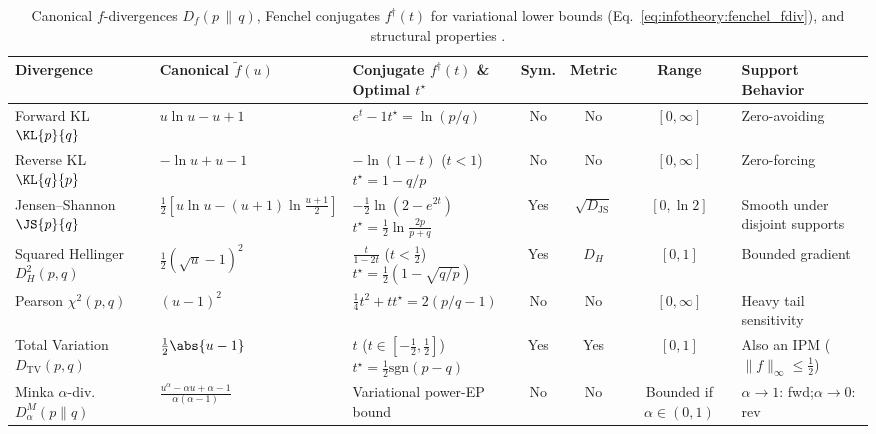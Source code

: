 \documentclass[../../../../master.tex]{subfiles}
\begin{document}
\begin{table}[htbp]
\centering
\footnotesize
\setlength{\tabcolsep}{3.5pt}
\renewcommand{\arraystretch}{1.22}
\caption{Canonical $f$-divergences $D_f(p \,\|\, q)$, Fenchel conjugates $f^\dagger(t)$ for variational lower bounds (Eq.~\eqref{eq:infotheory:fenchel_fdiv}), and structural properties  .}
\label{tab:infotheory:divergences}
\begin{tabularx}{\textwidth}{@{}>{\raggedright\arraybackslash}p{2.65cm}>{\raggedright\arraybackslash\hsize=0.92\hsize}X>{\raggedright\arraybackslash\hsize=1.08\hsize}Xccc>{\raggedright\arraybackslash}p{2.45cm}@{}}
\toprule
\textbf{Divergence} & \textbf{Canonical $\tilde{f}(u)$} & \textbf{Conjugate $f^\dagger(t)$ \& Optimal $t^\star$} & \textbf{Sym.} & \textbf{Metric} & \textbf{Range} & \textbf{Support Behavior} \\
\midrule
Forward KL $\KL{p}{q}$ & $u\ln u - u + 1$ & $e^t - 1$\newline $t^\star = \ln(p/q)$ & No & No & $[0,\infty]$ & Zero-avoiding \\
Reverse KL $\KL{q}{p}$ & $-\ln u + u - 1$ & $-\ln(1-t)$ ($t<1$)\newline $t^\star = 1 - q/p$ & No & No & $[0,\infty]$ & Zero-forcing \\
Jensen--Shannon $\JS{p}{q}$ & $\frac{1}{2}[u\ln u - (u+1)\ln\frac{u+1}{2}]$ & $-\frac{1}{2}\ln(2 - e^{2t})$\newline $t^\star = \frac{1}{2}\ln\frac{2p}{p+q}$ & Yes & $\sqrt{D_{\mathrm{JS}}}$ & $[0,\ln 2]$ & Smooth under disjoint supports \\
Squared Hellinger $D_H^2(p,q)$ & $\frac{1}{2}(\sqrt{u} - 1)^2$ & $\frac{t}{1 - 2t}$ ($t < \frac{1}{2}$)\newline $t^\star = \frac{1}{2}(1 - \sqrt{q/p})$ & Yes & $D_H$ & $[0,1]$ & Bounded gradient \\
Pearson $\chi^2(p,q)$ & $(u - 1)^2$ & $\frac{1}{4}t^2 + t$\newline $t^\star = 2(p/q - 1)$ & No & No & $[0,\infty]$ & Heavy tail sensitivity \\
Total Variation $D_{\mathrm{TV}}(p,q)$ & $\frac{1}{2}\abs{u - 1}$ & $t$ ($t \in [-\frac{1}{2}, \frac{1}{2}]$)\newline $t^\star = \frac{1}{2}\mathrm{sgn}(p-q)$ & Yes & Yes & $[0,1]$ & Also an IPM ($\|f\|_\infty \le \frac{1}{2}$) \\
Minka $\alpha$-div.\ $D_\alpha^M(p\|q)$ & $\frac{u^\alpha - \alpha u + \alpha - 1}{\alpha(\alpha - 1)}$ & Variational power-EP bound & No & No & Bounded if $\alpha\in(0,1)$ & $\alpha\to 1$: fwd;\newline $\alpha\to 0$: rev \\
\bottomrule
\end{tabularx}
\end{table}
\end{document}
